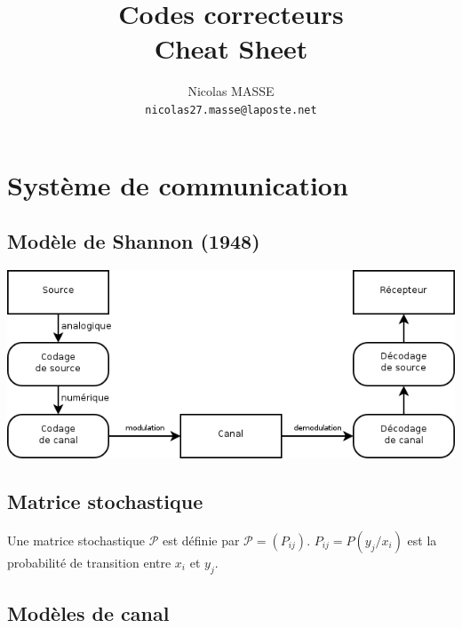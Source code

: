 \documentclass[a4paper,10pt]{leaflet}
\title{Codes correcteurs \\ {\normalsize \textsf{Cheat Sheet}}}
\author{Nicolas MASSE \\ \texttt{nicolas27.masse@laposte.net}}
\begin{document}
\maketitle

\fussy

\section{Système de communication}
\subsection{Modèle de Shannon (1948)}
\includegraphics[width=0.9\linewidth]{general2}

\subsection{Matrice stochastique}
Une matrice stochastique $\mathcal{P}$ est définie par $ \mathcal{P} = (P_{ij}) $. $P_{ij} = P(y_j/x_i)$ est la probabilité de transition entre $x_i$ et $y_j$.

\subsection{Modèles de canal}
\end{document}
